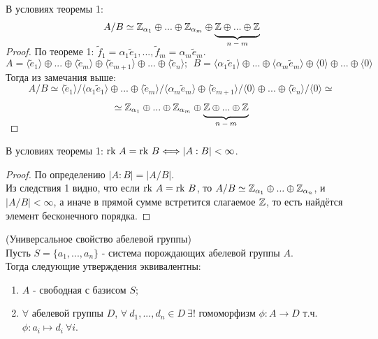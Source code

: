 \begin{consequensenum}
    В условиях теоремы 1:
    \[A/B \simeq \Z_{\alpha_1} \oplus ... \oplus \Z_{\alpha_m} \oplus \undermat{n-m}{\Z\oplus ... \oplus \Z}\]
    \tab
\end{consequensenum}
\begin{proof}
    По теореме 1: $\tilde{f}_1 = \alpha_1\tilde{e}_1,...,\tilde{f}_m = \alpha_m\tilde{e}_m$.
    \[A = \langle \tilde{e}_1 \rangle \oplus ... \oplus \langle \tilde{e}_m \rangle \oplus \langle \tilde{e}_{m+1} \rangle \oplus ... \oplus \langle \tilde{e}_n \rangle; \ \ B = \langle \alpha_1\tilde{e}_1 \rangle \oplus ... \oplus \langle \alpha_m\tilde{e}_m \rangle \oplus \langle 0 \rangle \oplus ... \oplus \langle 0 \rangle\]
    Тогда из замечания выше:
    \[A / B \simeq \langle \tilde{e}_1 \rangle / \langle \alpha_1\tilde{e}_1 \rangle \oplus ... \oplus \langle \tilde{e}_m \rangle / \langle \alpha_m\tilde{e}_m \rangle \oplus \langle \tilde{e}_{m+1} \rangle / \langle 0 \rangle \oplus ... \oplus \langle \tilde{e}_n \rangle / \langle 0 \rangle \simeq\]
    \[\simeq \Z_{\alpha_1} \oplus ... \oplus \Z_{\alpha_m} \oplus \undermat{n-m}{\Z\oplus ... \oplus \Z}\]
\end{proof}
\begin{consequensenum}
    В условиях теоремы 1: $\textup{rk } A = \textup{rk } B \Longleftrightarrow |A : B| < \infty$.
\end{consequensenum}
\begin{proof}
    По определению $|A : B| = |A/B|$. \\
    Из следствия 1 видно, что если $\textup{rk } A = \textup{rk } B$, то $A/B \simeq \mathbb{Z}_{\alpha_1} \oplus ... \oplus \mathbb{Z}_{\alpha_n}$, и $|A/B| < \infty$, а иначе в прямой сумме встретится слагаемое $\mathbb{Z}$, то есть найдётся элемент бесконечного порядка.
\end{proof}
\begin{subtheoremnum}(Универсальное свойство абелевой группы)\\
    Пусть $S = \{a_1,...,a_n\}$ - система порождающих абелевой группы $A$.\\
    Тогда следующие утверждения эквивалентны:
    \begin{enumerate}
        \item $A$ - свободная с базисом $S$;
        \item $\forall$ абелевой группы $D$, $\forall \ d_1,...,d_n \in D \ \exists!$ гомоморфизм $\phi: A\rightarrow D$ т.ч. $\phi: a_i \mapsto d_i \  \forall i$. 
    \end{enumerate} 
\end{subtheoremnum}
